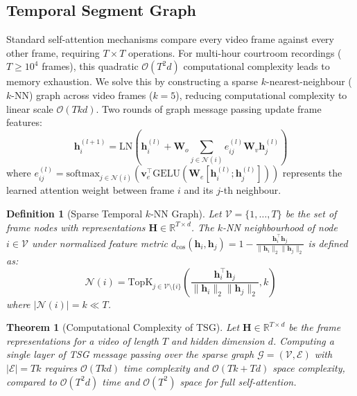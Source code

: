 \documentclass[letterpaper]{article}
\newtheorem{definition}{Definition}
\newtheorem{theorem}{Theorem}
\begin{document}
\subsection{Temporal Segment Graph}

Standard self-attention mechanisms compare every video frame against every other frame, requiring $T \times T$ operations. For multi-hour courtroom recordings ($T \ge 10^4$ frames), this quadratic $\mathcal{O}(T^2 d)$ computational complexity leads to memory exhaustion. We solve this by constructing a sparse $k$-nearest-neighbour ($k$-NN) graph across video frames ($k=5$), reducing computational complexity to linear scale $\mathcal{O}(T k d)$. Two rounds of graph message passing update frame features:
\begin{equation}
\mathbf{h}_i^{(l+1)} = \text{LN}\!\left(\mathbf{h}_i^{(l)} + \mathbf{W}_o \sum_{j \in \mathcal{N}(i)} e_{ij}^{(l)} \mathbf{W}_v \mathbf{h}_j^{(l)}\right)
\end{equation}
where $e_{ij}^{(l)} = \text{softmax}_{j \in \mathcal{N}(i)}\left(\mathbf{v}_e^\top \text{GELU}(\mathbf{W}_e [\mathbf{h}_i^{(l)} ; \mathbf{h}_j^{(l)}])\right)$ represents the learned attention weight between frame $i$ and its $j$-th neighbour.

\begin{definition}[Sparse Temporal $k$-NN Graph]
Let $\mathcal{V} = \{1, \dots, T\}$ be the set of frame nodes with representations $\mathbf{H} \in \mathbb{R}^{T \times d}$. The $k$-NN neighbourhood of node $i \in \mathcal{V}$ under normalized feature metric $d_{\text{cos}}(\mathbf{h}_i, \mathbf{h}_j) = 1 - \frac{\mathbf{h}_i^\top \mathbf{h}_j}{\|\mathbf{h}_i\|_2 \|\mathbf{h}_j\|_2}$ is defined as:
\begin{equation}
\mathcal{N}(i) = \text{TopK}_{j \in \mathcal{V} \setminus \{i\}} \left( \frac{\mathbf{h}_i^\top \mathbf{h}_j}{\|\mathbf{h}_i\|_2 \|\mathbf{h}_j\|_2}, k \right)
\end{equation}
where $|\mathcal{N}(i)| = k \ll T$.
\end{definition}

\begin{theorem}[Computational Complexity of TSG]
\label{thm:tsg_complexity}
Let $\mathbf{H} \in \mathbb{R}^{T \times d}$ be the frame representations for a video of length $T$ and hidden dimension $d$. Computing a single layer of TSG message passing over the sparse graph $\mathcal{G} = (\mathcal{V}, \mathcal{E})$ with $|\mathcal{E}| = T k$ requires $\mathcal{O}(T k d)$ time complexity and $\mathcal{O}(T k + T d)$ space complexity, compared to $\mathcal{O}(T^2 d)$ time and $\mathcal{O}(T^2)$ space for full self-attention.
\end{theorem}
\end{document}
